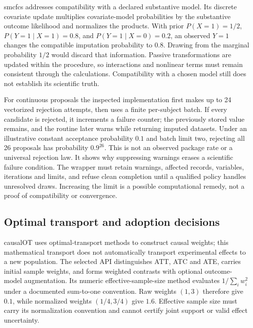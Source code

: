 smcfcs addresses compatibility with a declared substantive model. Its discrete covariate update multiplies covariate-model probabilities by the substantive outcome likelihood and normalizes the products. With prior $P(X=1)=1/2$, $P(Y=1\mid X=1)=0.8$, and $P(Y=1\mid X=0)=0.2$, an observed $Y=1$ changes the compatible imputation probability to $0.8$. Drawing from the marginal probability $1/2$ would discard that information. Passive transformations are updated within the procedure, so interactions and nonlinear terms must remain consistent through the calculations. Compatibility with a chosen model still does not establish its scientific truth.\citep{exec25_rtm_smcfcs,exec25_rtm_choice}

For continuous proposals the inspected implementation first makes up to 24 vectorized rejection attempts, then uses a finite per-subject batch. If every candidate is rejected, it increments a failure counter; the previously stored value remains, and the routine later warns while returning imputed datasets. Under an illustrative constant acceptance probability $0.1$ and batch limit two, rejecting all 26 proposals has probability $0.9^{26}$. This is not an observed package rate or a universal rejection law. It shows why suppressing warnings erases a scientific failure condition. The wrapper must retain warnings, affected records, variables, iterations and limits, and refuse clean completion until a qualified policy handles unresolved draws. Increasing the limit is a possible computational remedy, not a proof of compatibility or convergence.\citep{exec25_rtm_smcfcs,exec25_rtm_choice}

\subsection{Optimal transport and adoption decisions}

causalOT uses optimal-transport methods to construct causal weights; this mathematical transport does not automatically transport experimental effects to a new population. The selected API distinguishes ATT, ATC and ATE, carries initial sample weights, and forms weighted contrasts with optional outcome-model augmentation. Its numeric effective-sample-size method evaluates $1/\sum_i w_i^2$ under a documented sum-to-one convention. Raw weights $(1,3)$ therefore give $0.1$, while normalized weights $(1/4,3/4)$ give $1.6$. Effective sample size must carry its normalization convention and cannot certify joint support or valid effect uncertainty.\citep{exec25_rtm_causalOT,exec25_rtm_choice}


